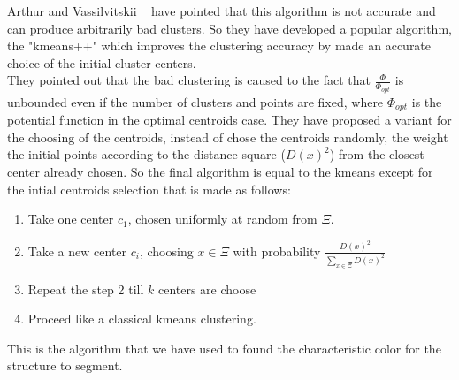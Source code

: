 \documentclass{standalone}
\begin{document}
	Arthur and Vassilvitskii ~\cite{Arthur2007} have pointed that this algorithm is not accurate and can produce arbitrarily bad clusters. So they have developed a popular algorithm, the "kmeans++" which improves the clustering accuracy by made an accurate choice of the initial cluster centers.\\ 
	They pointed out that the bad clustering is caused to the fact that $\frac{\Phi}{\Phi_{opt}}$ is unbounded even if the number of clusters and points are fixed, where $\Phi_{opt}$ is the potential function in the optimal centroids case. They have proposed a variant for the choosing of the centroids, instead of chose the centroids randomly, the weight the initial points according to the distance square ($D(x)^2$) from the closest center already chosen. So the final algorithm is equal to the kmeans except for the intial centroids selection that is made as follows: 
	\begin{enumerate}
		\item Take one center $c_1$, chosen uniformly at random from $\Xi$.
		
		\item  Take a new center $c_i$, choosing $x \in \Xi$ with probability $\frac{D(x)^2}{\sum _{x \in \Xi} D(x)^2}$
		
		\item Repeat the step 2 till $k$ centers are choose
		
		\item Proceed like a classical kmeans clustering.
	
	\end{enumerate}

	This is the algorithm that we have used to found the characteristic color for the structure to segment. 
\end{document}
